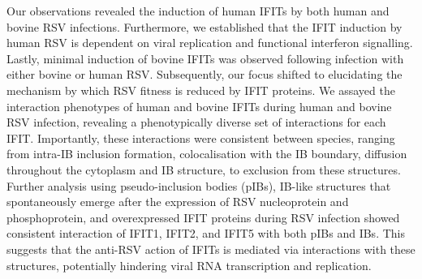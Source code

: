 Our observations revealed the induction of human IFITs by both human and bovine RSV infections. Furthermore, we established that the IFIT induction by human RSV is dependent on viral replication and functional interferon signalling. Lastly, minimal induction of bovine IFITs was observed following infection with either bovine or human RSV. Subsequently, our focus shifted to elucidating the mechanism by which RSV fitness is reduced by IFIT proteins. We assayed the interaction phenotypes of human and bovine IFITs during human and bovine RSV infection, revealing a phenotypically diverse set of interactions for each IFIT. Importantly, these interactions were consistent between species, ranging from intra-IB inclusion formation, colocalisation with the IB boundary, diffusion throughout the cytoplasm and IB structure, to exclusion from these structures. Further analysis using pseudo-inclusion bodies (pIBs), IB-like structures that spontaneously emerge after the expression of RSV nucleoprotein and phosphoprotein, and overexpressed IFIT proteins during RSV infection showed consistent interaction of IFIT1, IFIT2, and IFIT5 with both pIBs and IBs. This suggests that the anti-RSV action of IFITs is mediated via interactions with these structures, potentially hindering viral RNA transcription and replication.

